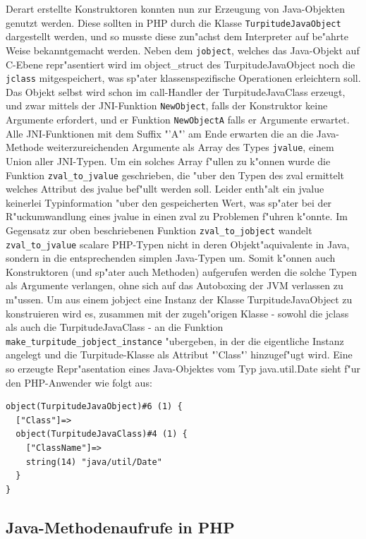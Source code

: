 Derart erstellte Konstruktoren konnten nun zur Erzeugung von Java-Objekten genutzt werden. Diese sollten in PHP durch die Klasse
\texttt{TurpitudeJavaObject} dargestellt werden, und so musste diese zun"achst dem Interpreter auf be"ahrte Weise bekanntgemacht werden.
Neben dem \texttt{jobject}, welches das Java-Objekt auf C-Ebene repr"asentiert wird im object\_struct des TurpitudeJavaObject noch die \texttt{jclass}
mitgespeichert, was sp"ater klassenspezifische Operationen erleichtern soll. Das Objekt selbst wird schon im call-Handler der TurpitudeJavaClass 
erzeugt, und zwar mittels der JNI-Funktion \texttt{NewObject}, falls der Konstruktor keine Argumente erfordert, und er Funktion \texttt{NewObjectA} falls
er Argumente erwartet. Alle JNI-Funktionen mit dem Suffix "'A"' am Ende erwarten die an die Java-Methode weiterzureichenden Argumente als Array
des Types \texttt{jvalue}, einem Union aller JNI-Typen. Um ein solches Array f"ullen zu k"onnen wurde die Funktion \texttt{zval\_to\_jvalue} geschrieben,
die "uber den Typen des zval ermittelt welches Attribut des jvalue bef"ullt werden soll. Leider enth"alt ein jvalue keinerlei Typinformation "uber den
gespeicherten Wert, was sp"ater bei der R"uckumwandlung eines jvalue in einen zval zu Problemen f"uhren k"onnte. Im Gegensatz zur oben beschriebenen 
Funktion \texttt{zval\_to\_jobject} wandelt \texttt{zval\_to\_jvalue} scalare PHP-Typen nicht in deren Objekt"aquivalente in Java, sondern in die
entsprechenden simplen Java-Typen um. Somit k"onnen auch Konstruktoren (und sp"ater auch Methoden) aufgerufen werden die solche Typen als Argumente
verlangen, ohne sich auf das Autoboxing der JVM verlassen zu m"ussen.
Um aus einem jobject eine Instanz der Klasse
TurpitudeJavaObject zu konstruieren wird es, zusammen mit der zugeh"origen Klasse - sowohl die jclass als auch die TurpitudeJavaClass - an die Funktion 
\texttt{make\_turpitude\_jobject\_instance} "ubergeben, in der die eigentliche Instanz angelegt und die Turpitude-Klasse als Attribut "'Class"' hinzugef"ugt wird. 
Eine so erzeugte Repr"asentation eines Java-Objektes vom Typ java.util.Date sieht f"ur den PHP-Anwender wie folgt aus:
\begin{lstlisting}[caption=Dump eines TurpitudeJavaObject]
object(TurpitudeJavaObject)#6 (1) {
  ["Class"]=>
  object(TurpitudeJavaClass)#4 (1) {
    ["ClassName"]=>
    string(14) "java/util/Date"
  }
}
\end{lstlisting}

\subsection{Java-Methodenaufrufe in PHP}
\label{sec:chap1:impl:6}


